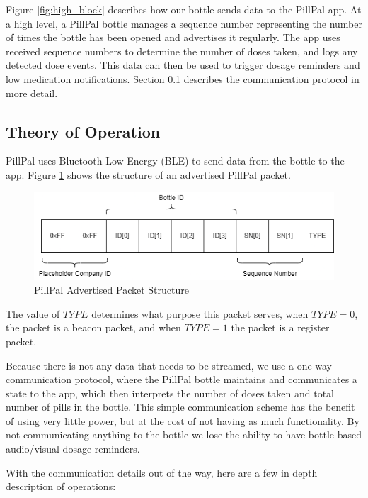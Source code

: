 \documentclass[sigconf]{acmart}
\begin{document}
Figure \ref{fig:high_block} describes how our bottle sends data to the PillPal app. At a high level, a PillPal bottle manages a sequence number representing the number of times the bottle has been opened and advertises it regularly. The app uses received sequence numbers to determine the number of doses taken, and logs any detected dose events. This data can then be used to trigger dosage reminders and low medication notifications. Section \ref{sec:operation} describes the communication protocol in more detail.

\subsection{Theory of Operation}
\label{sec:operation}
PillPal uses Bluetooth Low Energy (BLE) to send data from the bottle to the app. Figure \ref{fig:packet} shows the structure of an advertised PillPal packet.

\begin{figure}[h]
  \centering
  \includegraphics[width=\linewidth]{images/packet.png}
  \caption{PillPal Advertised Packet Structure}
  \label{fig:packet}
\end{figure}

The value of $TYPE$ determines what purpose this packet serves, when $TYPE = 0$, the packet is a beacon packet, and when $TYPE=1$ the packet is a register packet.

Because there is not any data that needs to be streamed, we use a one-way communication protocol, where the PillPal bottle maintains and communicates a state to the app, which then interprets the number of doses taken and total number of pills in the bottle. This simple communication scheme has the benefit of using very little power, but at the cost of not having as much functionality. By not communicating anything to the bottle we lose the ability to have bottle-based audio/visual dosage reminders.

With the communication details out of the way, here are a few in depth description of operations:
\end{document}
